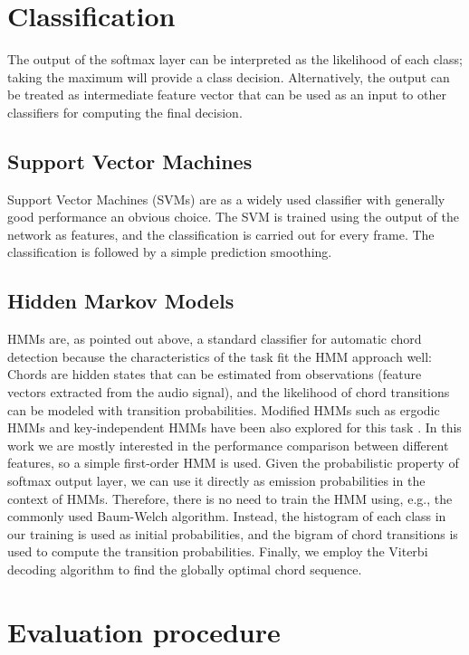 \documentclass{article}
\begin{document}
\section{Classification}\label{sec:class}
The output of the softmax layer can be interpreted as the likelihood of each class; taking the maximum will provide a class decision. Alternatively, the output can be treated as intermediate feature vector that can be used as an input to other classifiers for computing the final decision. 
\subsection{Support Vector Machines}
Support Vector Machines (SVMs) are as a widely used classifier with generally good performance an obvious choice. The SVM is trained using the output of the network as features, and the classification is carried out for every frame. The classification is followed by a simple prediction smoothing.
\subsection{Hidden Markov Models}
HMMs are, as pointed out above, a standard classifier for automatic chord detection because the characteristics of the task fit the HMM approach well: Chords are hidden states that can be estimated from observations (feature vectors extracted from the audio signal), and the likelihood of chord transitions can be modeled with transition probabilities. 
Modified HMMs such as ergodic HMMs and key-independent HMMs have been also explored for this task \cite{papadopoulos2007large,lee2008acoustic}. In this work we are mostly interested in the performance comparison between different features, so a simple first-order HMM is used. 
Given the probabilistic property of softmax output layer, we can use it directly as emission probabilities in the context of HMMs. Therefore, there is no need to train the HMM using, e.g., the commonly used Baum-Welch algorithm. Instead, the histogram of each class in our training is used as initial probabilities, and the bigram of chord transitions is used to compute the transition probabilities. Finally, we employ the Viterbi decoding algorithm to find the globally optimal chord sequence. 

\section{Evaluation procedure}
\end{document}
